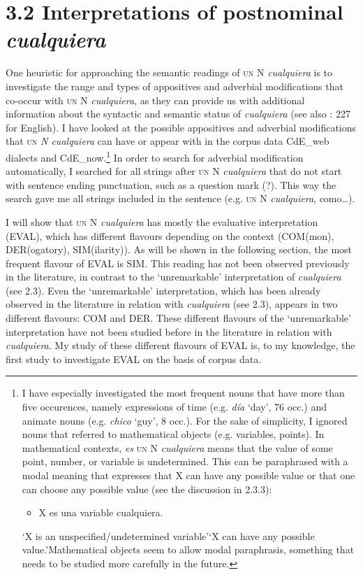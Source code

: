 \section{\textbf{3.2} \textbf{Interpretations} \textbf{of} \textbf{postnominal} \textbf{\textit{cualquiera}}}

One heuristic for approaching the semantic readings of \textsc{un} N \textit{cualquiera} is to investigate the range and types of appositives and adverbial modifications that co-occur with \textsc{un} N \textit{cualquiera}, as they can provide us with additional information about the syntactic and semantic status of \textit{cualquiera} (see also \citealt{Condoravdi2015}: 227 for English). I have looked at the possible appositives and adverbial modifications that \textsc{un} \textit{N cualquiera} can have or appear with in the corpus data CdE\_web dialects and CdE\_now.\footnote{{I have especially investigated the most frequent nouns that have more than five occurences, namely expressions of time (e.g.} {\textit{día}} {‘day’, 76 occ.) and animate nouns (e.g.} {\textit{chico}} {‘guy’, 8 occ.). For the sake of simplicity, I ignored nouns that referred to mathematical objects (e.g. variables, points). In mathematical contexts,} {\textit{es} }\textsc{un} {N}{ \textit{cualquiera}} {means that the value of some point, number, or variable is undetermined. This can be paraphrased with a modal meaning that expresses that X can have any possible value or that one can choose any possible value (see the discussion in 2.3.3):}

\begin{itemize}
\item
{X es una variable cualquiera.}
\end{itemize}
{‘X is an unspecified/undetermined variable’}{‘X can have any possible value.’}{Mathematical objects seem to allow modal paraphrasis, something that needs to be studied more carefully in the future.}} In order to search for adverbial modification automatically, I searched for all strings after \textsc{un} N \textit{cualquiera} that do not start with sentence ending punctuation, such as a question mark (?). This way the search gave me all strings included in the sentence (e.g. \textsc{un} N \textit{cualquiera}, como…).

  I will show that \textsc{un} N \textit{cualquiera} has mostly the evaluative interpretation (EVAL), which has different flavours depending on the context (COM(mon), DER(ogatory), SIM(ilarity)). As will be shown in the following section, the most frequent flavour of EVAL is SIM. This reading has not been observed previously in the literature, in contrast to the ‘unremarkable’ interpretation of \textit{cualquiera} (see 2.3). Even the ‘unremarkable’ interpretation, which has been already observed in the literature in relation with \textit{cualquiera} (see 2.3), appears in two different flavours: COM and DER. These different flavours of the ‘unremarkable’ interpretation have not been studied before in the literature in relation with \textit{cualquiera}. My study of these different flavours of EVAL is, to my knowledge, the first study to investigate EVAL on the basis of corpus data.

